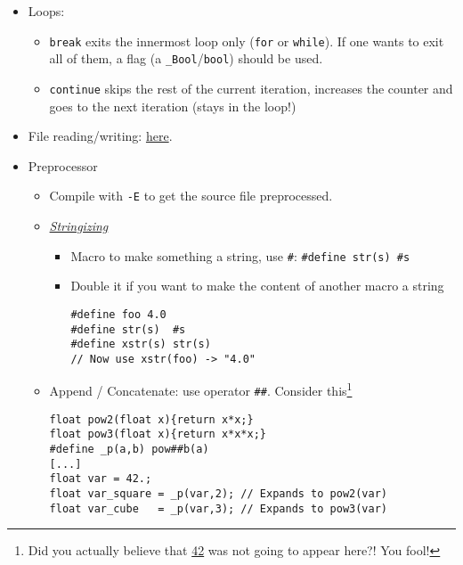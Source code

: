 \documentclass[a4paper,12pt,%
              final%
              ]{article}
\begin{document}
\begin{itemize}
  \item Loops:
    \begin{itemize}
      \item \texttt{break} exits the innermost loop only (\texttt{for} or \texttt{while}). If one wants to exit all of them, a flag (a \verb|_Bool|/\verb|bool|) should be used.
      \item \texttt{continue} skips the rest of the current iteration, increases the counter and goes to the next iteration (stays in the loop!)
    \end{itemize}
  \item File reading/writing: \href{https://www.programiz.com/c-programming/c-file-input-output}{here}.
  \item Preprocessor
    \begin{itemize}
      \item Compile with \verb|-E| to get the source file preprocessed.
      \item \href{https://gcc.gnu.org/onlinedocs/gcc-7.5.0/cpp/Stringizing.html}{\emph{Stringizing}}
        \begin{itemize}
          \item Macro to make something a string, use \verb|#|: \verb|#define str(s) #s|
          \item Double it if you want to make the content of another macro a string
\begin{Verbatim}[samepage=true]
#define foo 4.0
#define str(s)  #s
#define xstr(s) str(s)
// Now use xstr(foo) -> "4.0"
\end{Verbatim}
        \end{itemize}
      \item Append / Concatenate: use operator \verb|##|. Consider this\footnote{Did you actually believe that \href{https://hitchhikers.fandom.com/wiki/42}{42} was not going to appear here?! You fool!}
\begin{Verbatim}[samepage=true]
float pow2(float x){return x*x;}
float pow3(float x){return x*x*x;}
#define _p(a,b) pow##b(a)
[...]
float var = 42.;
float var_square = _p(var,2); // Expands to pow2(var)
float var_cube   = _p(var,3); // Expands to pow3(var)
\end{Verbatim}
    \end{itemize}
  \end{itemize}
\end{document}

